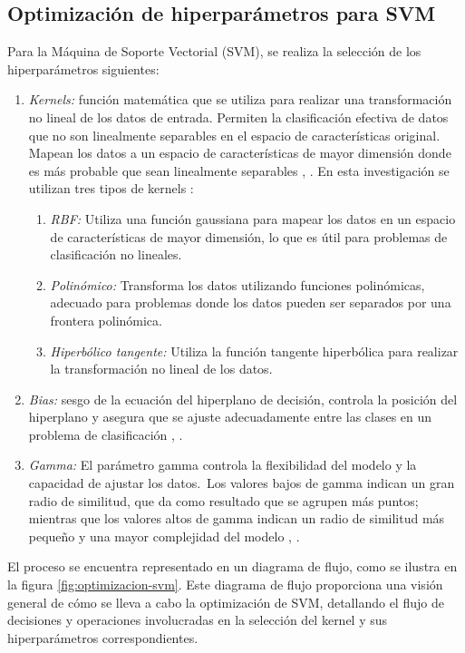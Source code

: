 \subsection{Optimización de hiperparámetros para SVM}

Para la Máquina de Soporte Vectorial (SVM), se realiza la selección de los hiperparámetros siguientes:

	\begin{enumerate}
		\item \textit{Kernels:} función matemática que se utiliza para realizar una transformación no lineal de los datos de entrada. Permiten la clasificación efectiva de datos que no son linealmente separables en el espacio de características original. Mapean los datos a un espacio de características de mayor dimensión donde es más probable que sean linealmente separables \citep{scholkopf2018learning}, \citep{bishop2006pattern}. En esta investigación se utilizan tres tipos de kernels \citep{scholkopf2018learning}:
		\begin{enumerate}
			\item \textit{RBF:} Utiliza una función gaussiana para mapear los datos en un espacio de características de mayor dimensión, lo que es útil para problemas de clasificación no lineales.
			\item \textit{Polinómico:} Transforma los datos utilizando funciones polinómicas, adecuado para problemas donde los datos pueden ser separados por una frontera polinómica.
			\item \textit{Hiperbólico tangente:} Utiliza la función tangente hiperbólica para realizar la transformación no lineal de los datos.
		\end{enumerate}
		\item \textit{Bias:} sesgo de la ecuación del hiperplano de decisión, controla la posición del hiperplano y asegura que se ajuste adecuadamente entre las clases en un problema de clasificación \citep{scholkopf2018learning}, \citep{joachims2002learning}.
		\item \textit{Gamma:} El parámetro gamma controla la flexibilidad del modelo y la capacidad de ajustar los datos. Los valores bajos de gamma indican un gran radio de similitud, que da como resultado que se agrupen más puntos; mientras que los valores altos de gamma indican un radio de similitud más pequeño y una mayor complejidad del modelo  \citep{bishop2006pattern}, \citep{scholkopf2018learning}.
	\end{enumerate}


El proceso se encuentra representado en un diagrama de flujo, como se ilustra en la figura \ref{fig:optimizacion-svm}. Este diagrama de flujo proporciona una visión general de cómo se lleva a cabo la optimización de SVM, detallando el flujo de decisiones y operaciones involucradas en la selección del kernel y sus hiperparámetros correspondientes.


